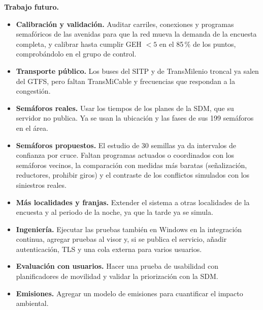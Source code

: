 \textbf{Trabajo futuro.}
\begin{itemize}[noitemsep]
    \item \textbf{Calibración y validación.} Auditar carriles, conexiones y programas semafóricos de las avenidas para que la red mueva la demanda de la encuesta completa, y calibrar hasta cumplir GEH $<5$ en el 85\,\% de los puntos, comprobándolo en el grupo de control.
    \item \textbf{Transporte público.} Los buses del SITP y de TransMilenio troncal ya salen del GTFS, pero faltan TransMiCable y frecuencias que respondan a la congestión.
    \item \textbf{Semáforos reales.} Usar los tiempos de los planes de la SDM, que su servidor no publica. Ya se usan la ubicación y las fases de sus 199 semáforos en el área.
    \item \textbf{Semáforos propuestos.} El estudio de 30 semillas ya da intervalos de confianza por cruce. Faltan programas actuados o coordinados con los semáforos vecinos, la comparación con medidas más baratas (señalización, reductores, prohibir giros) y el contraste de los conflictos simulados con los siniestros reales.
    \item \textbf{Más localidades y franjas.} Extender el sistema a otras localidades de la encuesta y al periodo de la noche, ya que la tarde ya se simula.
    \item \textbf{Ingeniería.} Ejecutar las pruebas también en Windows en la integración continua, agregar pruebas al visor y, si se publica el servicio, añadir autenticación, TLS y una cola externa para varios usuarios.
    \item \textbf{Evaluación con usuarios.} Hacer una prueba de usabilidad con planificadores de movilidad y validar la priorización con la SDM.
    \item \textbf{Emisiones.} Agregar un modelo de emisiones para cuantificar el impacto ambiental.
\end{itemize}
